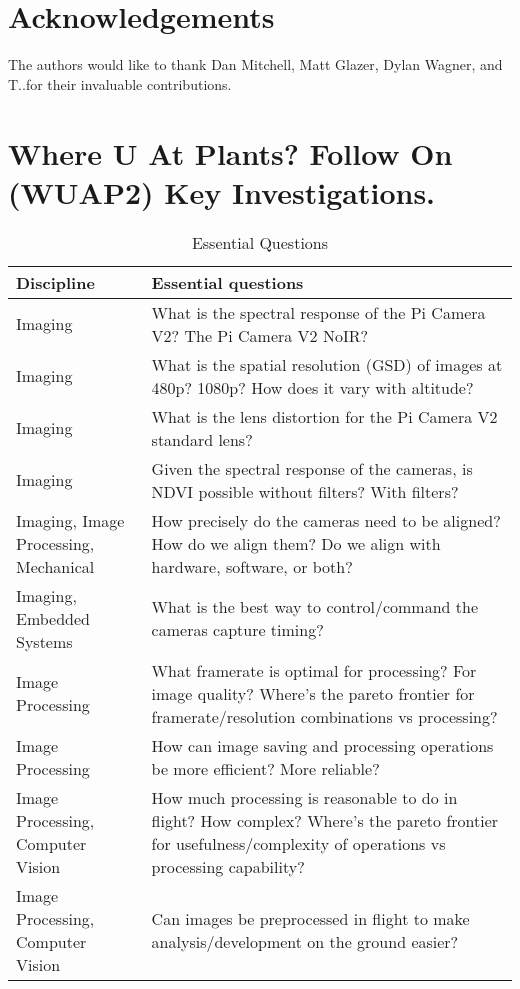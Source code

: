 \documentclass[conference]{IEEEtran} %
\begin{document}
\section*{Acknowledgements}
The authors would like to thank Dan Mitchell, Matt Glazer, Dylan Wagner, and T.\@J.\@Tarazevits for their invaluable contributions. 




\onecolumn
\appendices{}


\section{Where U At Plants? Follow On (WUAP2) Key Investigations.}
\noindent
\begin{table}[h!]
  \label{essentialquestions}
  \caption{Essential Questions}
  \centering
\begin{tabularx}{\linewidth}{@{}p{}X@{}}
    \textbf{Discipline} & \textbf{Essential questions} \\
    \midrule
    Imaging & What is the spectral response of the Pi Camera V2? The Pi Camera V2 NoIR? \\
    Imaging & What is the spatial resolution (GSD) of images at 480p? 1080p? How does it vary with altitude? \\
    Imaging & What is the lens distortion for the Pi Camera V2 standard lens? \\
    Imaging & Given the spectral response of the cameras, is NDVI possible without filters? With filters? \\
    Imaging, Image Processing, Mechanical & How precisely do the cameras need to be aligned? How do we align them? Do we align with hardware, software, or both? \\
    Imaging, Embedded Systems & What is the best way to control/command the cameras capture timing? \\
    Image Processing & What framerate is optimal for processing? For image quality? Where's the pareto frontier for framerate/resolution combinations vs processing? \\
    Image Processing & How can image saving and processing operations be more efficient? More reliable? \\
    Image Processing, Computer Vision & How much processing is reasonable to do in flight? How complex? Where's the pareto frontier for usefulness/complexity of operations vs processing capability? \\
    Image Processing, Computer Vision & Can images be preprocessed in flight to make analysis/development on the ground easier? \\

\end{tabularx}
\end{table}
\end{document}
